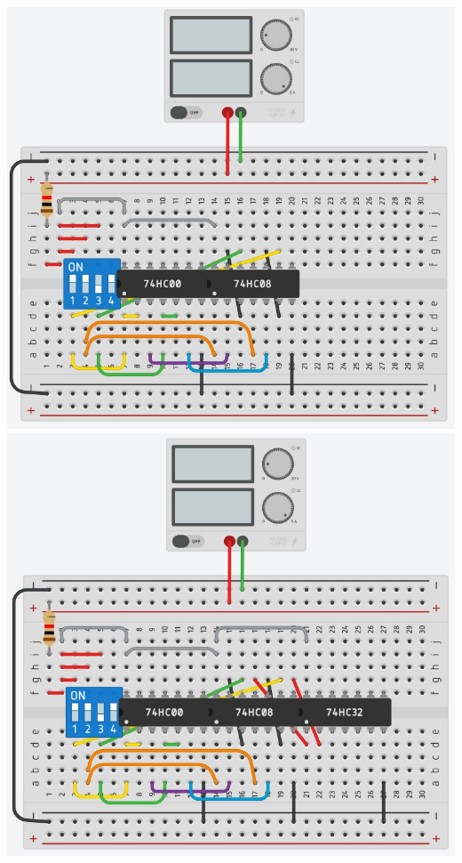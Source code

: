 \documentclass[]{article}
\begin{document}
		\includegraphics[scale=0.6]{Images/Tinkercad 04.jpg} \\
		\includegraphics[scale=0.6]{Images/Tinkercad 05.jpg} \\
\end{document}
